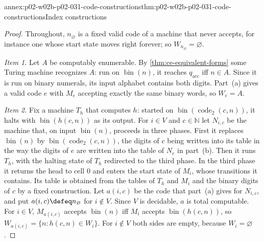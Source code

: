 \begin{annexitem}{annex:p02-w02b-p02-031-code-constructions}{thm:p02-w02b-p02-031-code-constructions}{Index constructions}
\begin{proof}
Throughout, \(n_\varnothing\) is a fixed valid code of a machine that never
accepts, for instance one whose start state moves right forever; so
\(W_{n_\varnothing}=\varnothing\).

\emph{Item 1.}  Let \(A\) be computably enumerable.  By
\cref{thm:ce-equivalent-forms} some Turing machine recognizes \(A\): run on
\(\operatorname{bin}(n)\), it reaches \(q_{\mathrm{acc}}\) iff \(n\in A\).
Since it is run on binary numerals, its input alphabet contains both digits.
Part~(a) gives a valid code \(e\) with \(M_e\) accepting exactly the same
binary words, so \(W_e=A\).

\emph{Item 2.}  Fix a machine \(T_h\) that computes \(h\): started on
\(\operatorname{bin}(\operatorname{code}_2(c,n))\), it halts with
\(\operatorname{bin}(h(c,n))\) as its output.  For \(i\in V\) and
\(c\in\mathbb N\) let \(N_{i,c}\) be the machine that, on input
\(\operatorname{bin}(n)\), proceeds in three phases.  First it replaces
\(\operatorname{bin}(n)\) by \(\operatorname{bin}(\operatorname{code}_2(c,n))\),
the digits of \(c\) being written into its table in the way the digits of
\(e\) are written into the table of \(N_e\) in part~(b).  Then it runs
\(T_h\), with the halting state of \(T_h\) redirected to the third phase.  In
the third phase it returns the head to cell \(0\) and enters the start state of
\(M_i\), whose transitions it contains.  Its table is obtained from the tables
of \(T_h\) and \(M_i\) and the binary digits of \(c\) by a fixed construction.
Let \(a(i,c)\) be the code that part~(a) gives for \(N_{i,c}\), and put
\(a(i,c)\defeq n_\varnothing\) for \(i\notin V\).  Since \(V\) is decidable,
\(a\) is total computable.  For \(i\in V\), \(M_{a(i,c)}\) accepts
\(\operatorname{bin}(n)\) iff \(M_i\) accepts \(\operatorname{bin}(h(c,n))\), so
\(W_{a(i,c)}=\{n:h(c,n)\in W_i\}\).  For \(i\notin V\) both sides are empty,
because \(W_i=\varnothing\).


\end{proof}
\end{annexitem}

